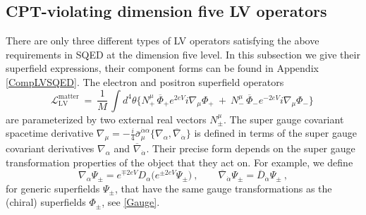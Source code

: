 \documentclass[12pt]{revtex4}
\begin{document}
\subsection{CPT-violating dimension five LV operators}
\label{Dim5LV}


There are only three different types of LV operators satisfying the 
above requirements in SQED at the
dimension five level. In this subsection we give their superfield
expressions, their component forms can be found in Appendix
\ref{CompLVSQED}. The electron and positron superfield operators  
\begin{equation}
\label{LV_matter}
  \mathcal{L}_{\mathrm{LV}}^{\mathrm{matter}} ~=~ 
\frac{1}{M}\,   \int d^4\theta \Big\{ 
N_+^\mu\, \overline{\Phi}_+ e^{2eV} i \nabla_\mu \Phi_+ 
~+~ N_{-}^\mu\, \overline{\Phi}_- e^{-2eV} i \nabla_\mu  {\Phi}_-
                 \Big\}~
\end{equation}
are parameterized by two external real vectors $N_\pm^\mu$.  
The super gauge covariant spacetime derivative 
$\nabla_\mu   =  - \frac{i}{4} 
\bar{\sigma}_\mu^{\dot{\alpha}\alpha}
\{ \nabla_\alpha, \overline{\nabla}_{\dot{\alpha}} \} 
$ 
is defined in terms of the super gauge covariant derivatives 
$\nabla_\alpha$ and $\overline{\nabla}_{\dot{\alpha}}$. Their precise
form depends on the super gauge transformation properties of the
object that they act on. For example, we define 
\begin{equation}
\nabla_\alpha \Psi_\pm = 
e^{\mp 2eV} D_\alpha \big( e^{\pm 2eV} \Psi_\pm \big)~, 
\qquad 
\overline{\nabla}_{\dot{\alpha}} \Psi_\pm =
\overline{D}_{\dot{\alpha}} \Psi_\pm~,
\end{equation} 
for generic superfields $\Psi_\pm$, that have the same gauge
transformations as the (chiral) superfields $\Phi_\pm$, see 
\eqref{Gauge}. 
\end{document}
